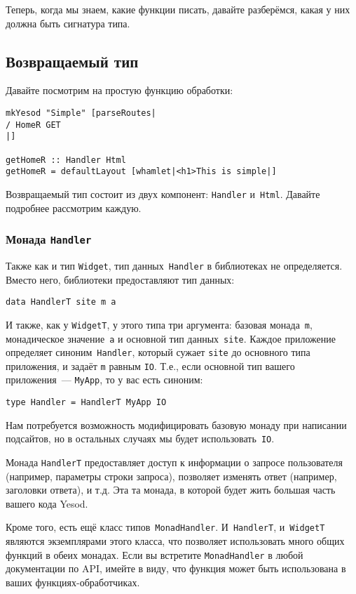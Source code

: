 Теперь, когда мы знаем, какие функции писать, давайте разберёмся, какая у них
должна быть сигнатура типа.

\subsection{Возвращаемый тип}
Давайте посмотрим на простую функцию обработки:
\begin{lstlisting}
mkYesod "Simple" [parseRoutes|
/ HomeR GET
|]

getHomeR :: Handler Html
getHomeR = defaultLayout [whamlet|<h1>This is simple|]
\end{lstlisting}

Возвращаемый тип состоит из двух компонент: \lstinline'Handler' и~\lstinline'Html'. Давайте
подробнее рассмотрим каждую.

\subsubsection{Монада \lstinline'Handler'}
Также как и тип \lstinline'Widget', тип данных~\lstinline'Handler' в библиотеках не
определяется. Вместо него, библиотеки предоставляют тип данных:
\begin{lstlisting}
data HandlerT site m a
\end{lstlisting}

И также, как у \lstinline'WidgetT', у этого типа три аргумента: базовая монада~\lstinline'm',
монадическое значение~\lstinline'a' и основной тип данных~\lstinline'site'. Каждое приложение
определяет синоним~\lstinline'Handler', который сужает \lstinline'site' до основного типа приложения,
и задаёт \lstinline'm' равным \lstinline'IO'. Т.е., если основной тип вашего приложения~--- \lstinline'MyApp',
то у вас есть синоним:
\begin{lstlisting}
type Handler = HandlerT MyApp IO
\end{lstlisting}

Нам потребуется возможность модифицировать базовую монаду при написании подсайтов, но в
остальных случаях мы будет использовать~\lstinline'IO'.

Монада \lstinline'HandlerT' предоставляет доступ к информации о запросе пользователя
(например, параметры строки запроса), позволяет изменять ответ (например, заголовки
ответа), и т.д. Эта та монада, в которой будет жить большая часть вашего кода Yesod.

Кроме того, есть ещё класс типов~\lstinline'MonadHandler'. И~\lstinline'HandlerT',
и~\lstinline'WidgetT' являются экземплярами этого класса, что позволяет использовать
много общих функций в обеих монадах. Если вы встретите \lstinline'MonadHandler' в любой
документации по API, имейте в виду, что функция может быть использована в
ваших функциях-обработчиках.

